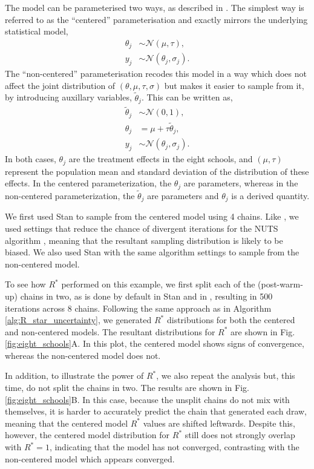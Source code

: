 \documentclass{article}
\newcommand{\N}{\mathcal{N}}
\begin{document}
The model can be parameterised two ways, as described in \cite{vehtari2019rank}. The simplest way is referred to as the ``centered'' parameterisation and exactly mirrors the underlying statistical model,
%
\begin{align*}
\theta_j &\sim \N(\mu, \tau), \\
y_j &\sim \N(\theta_j, \sigma_j).
\end{align*}
%
The ``non-centered'' parameterisation recodes this model in a way which does not affect the joint distribution of $(\theta, \mu, \tau, \sigma)$ but makes it easier to sample from it, by introducing auxillary variables, $\tilde \theta_j$. This can be written as,
%
\begin{align*}
\tilde{\theta}_j &\sim \N(0, 1), \\
\theta_j &= \mu + \tau \tilde{\theta}_j,\\
y_j &\sim \N(\theta_j, \sigma_j).
\end{align*}
%
In both cases, $\theta_j$ are the treatment effects in the eight schools, and $(\mu, \tau)$ represent the population mean and standard deviation 
of the distribution of these effects. In the centered parameterization, the $\theta_j$ are parameters, whereas in the non-centered parameterization, the $\tilde{\theta}_j$ are parameters and $\theta_j$ is a derived quantity.

We first used Stan \citep{carpenter2017stan} to sample from the centered model using 4 chains. Like \cite{vehtari2019rank}, we used settings that reduce the chance of divergent iterations for the NUTS algorithm \citep{hoffman2014no}, meaning that the resultant sampling distribution is likely to be biased. We also used Stan with the same algorithm settings to sample from the non-centered model.

To see how $R^*$ performed on this example, we first split each of the (post-warm-up) chains in two, as is done by default in Stan \citep{carpenter2017stan} and in \cite{vehtari2019rank}, resulting in 500 iterations across 8 chains. Following the same approach as in Algorithm \ref{alg:R_star_uncertainty}, we generated $R^*$ distributions for both the centered and non-centered models. The resultant distributions for $R^*$ are shown in Fig.\ref{fig:eight_schools}A. In this plot, the centered model shows signs of convergence, whereas the non-centered model does not.

In addition, to illustrate the power of $R^*$, we also repeat the analysis but, this time, do not split the chains in two. The results are shown in Fig.\ref{fig:eight_schools}B. In this case, because the unsplit chains do not mix with themselves, it is harder to accurately predict the chain that generated each draw, meaning that the centered model $R^*$ values are shifted leftwards. Despite this, however, the centered model distribution for $R^*$ still does not strongly overlap with $R^*=1$, indicating that the model has not converged, contrasting with the non-centered model which appears converged.
\end{document}
